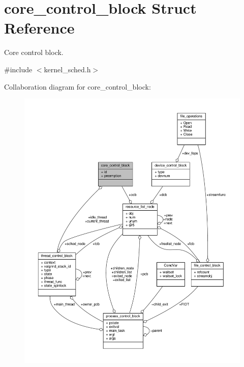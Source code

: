 \hypertarget{structcore__control__block}{\section{core\-\_\-control\-\_\-block Struct Reference}
\label{structcore__control__block}
}


Core control block.  




{\ttfamily \#include $<$kernel\-\_\-sched.\-h$>$}



Collaboration diagram for core\-\_\-control\-\_\-block\-:
\nopagebreak
\begin{figure}[H]
\begin{center}
\leavevmode
\includegraphics[width=350pt]{structcore__control__block__coll__graph}
\end{center}
\end{figure}
